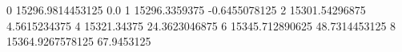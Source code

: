 0 15296.9814453125 0.0
1 15296.3359375 -0.6455078125
2 15301.54296875 4.5615234375
4 15321.34375 24.3623046875
6 15345.712890625 48.7314453125
8 15364.9267578125 67.9453125
